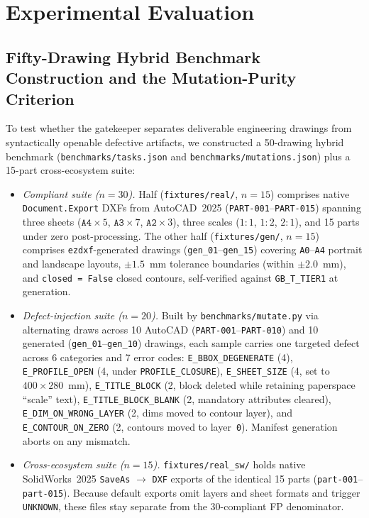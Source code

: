 \documentclass[nocopyright,nolists,upint,varvw,hyphenate]{asmejour}
\begin{document}
\section{Experimental Evaluation}\label{sec:eval}

\subsection{Fifty-Drawing Hybrid Benchmark Construction and the Mutation-Purity Criterion}\label{sec:benchmark_design}

To test whether the gatekeeper separates deliverable engineering drawings from syntactically openable defective artifacts, we constructed a 50-drawing hybrid benchmark (\texttt{benchmarks/tasks.json} and \texttt{benchmarks/mutations.json}) plus a 15-part cross-ecosystem suite:

\begin{itemize}
\item \emph{Compliant suite ($n = 30$).} Half (\texttt{fixtures/real/}, $n = 15$) comprises native \texttt{Document.Export} DXFs from AutoCAD~2025 (\texttt{PART-001}--\texttt{PART-015}) spanning three sheets ($\texttt{A4} \times 5$, $\texttt{A3} \times 7$, $\texttt{A2} \times 3$), three scales ($1{:}1$, $1{:}2$, $2{:}1$), and 15 parts under zero post-processing. The other half (\texttt{fixtures/gen/}, $n = 15$) comprises \texttt{ezdxf}-generated drawings (\texttt{gen\_01}--\texttt{gen\_15}) covering \texttt{A0}--\texttt{A4} portrait and landscape layouts, $\pm 1.5$~mm tolerance boundaries (within $\pm 2.0$~mm), and \texttt{closed = False} closed contours, self-verified against \texttt{GB\_T\_TIER1} at generation.
\item \emph{Defect-injection suite ($n = 20$).} Built by \texttt{benchmarks/mutate.py} via alternating draws across 10 AutoCAD (\texttt{PART-001}--\texttt{PART-010}) and 10 generated (\texttt{gen\_01}--\texttt{gen\_10}) drawings, each sample carries one targeted defect across 6 categories and 7 error codes: \texttt{E\_BBOX\_DEGENERATE} (4), \texttt{E\_PROFILE\_OPEN} (4, under \texttt{PROFILE\_CLOSURE}), \texttt{E\_SHEET\_SIZE} (4, set to $400 \times 280$~mm), \texttt{E\_TITLE\_BLOCK} (2, block deleted while retaining paperspace ``scale'' text), \texttt{E\_TITLE\_BLOCK\_BLANK} (2, mandatory attributes cleared), \texttt{E\_DIM\_ON\_WRONG\_LAYER} (2, dims moved to contour layer), and \texttt{E\_CONTOUR\_ON\_ZERO} (2, contours moved to layer~\texttt{0}). Manifest generation aborts on any mismatch.
\item \emph{Cross-ecosystem suite ($n = 15$).} \texttt{fixtures/real\_sw/} holds native SolidWorks~2025 \texttt{SaveAs} $\to$ \texttt{DXF} exports of the identical 15 parts (\texttt{part-001}--\texttt{part-015}). Because default exports omit layers and sheet formats and trigger \texttt{UNKNOWN}, these files stay separate from the 30-compliant FP denominator.
\end{itemize}
\end{document}
